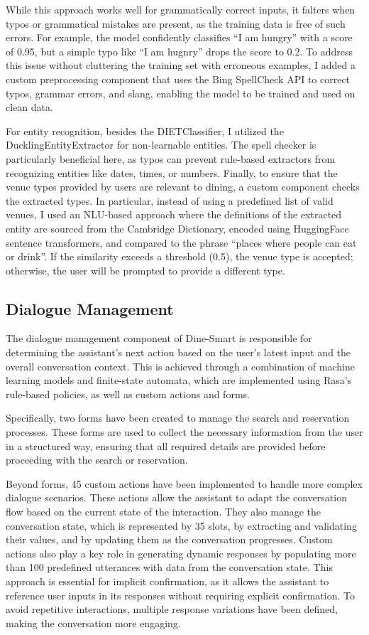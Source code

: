 \documentclass[twocolumn]{article}
\begin{document}
While this approach works well for grammatically correct inputs, it falters when typos or grammatical mistakes are present, as the training data is free of such errors. For example, the model confidently classifies ``I am hungry'' with a score of 0.95, but a simple typo like ``I am hugnry'' drops the score to 0.2. To address this issue without cluttering the training set with erroneous examples, I added a custom preprocessing component that uses the Bing SpellCheck API to correct typos, grammar errors, and slang, enabling the model to be trained and used on clean data.

For entity recognition, besides the DIETClassifier, I utilized the DucklingEntityExtractor for non-learnable entities. The spell checker is particularly beneficial here, as typos can prevent rule-based extractors from recognizing entities like dates, times, or numbers. Finally, to ensure that the venue types provided by users are relevant to dining, a custom component checks the extracted types. In particular, instead of using a predefined list of valid venues, I used an NLU-based approach where the definitions of the extracted entity are sourced from the Cambridge Dictionary, encoded using HuggingFace sentence transformers, and compared to the phrase ``places where people can eat or drink''. If the similarity exceeds a threshold (0.5), the venue type is accepted; otherwise, the user will be prompted to provide a different type.

\subsection{Dialogue Management}

The dialogue management component of Dine-Smart is responsible for determining the assistant's next action based on the user's latest input and the overall conversation context. This is achieved through a combination of machine learning models and finite-state automata, which are implemented using Rasa's rule-based policies, as well as custom actions and forms.

Specifically, two forms have been created to manage the search and reservation processes. These forms are used to collect the necessary information from the user in a structured way, ensuring that all required details are provided before proceeding with the search or reservation.

Beyond forms, 45 custom actions have been implemented to handle more complex dialogue scenarios. These actions allow the assistant to adapt the conversation flow based on the current state of the interaction. They also manage the conversation state, which is represented by 35 slots, by extracting and validating their values, and by updating them as the conversation progresses. Custom actions also play a key role in generating dynamic responses by populating more than 100 predefined utterances with data from the conversation state. This approach is essential for implicit confirmation, as it allows the assistant to reference user inputs in its responses without requiring explicit confirmation. To avoid repetitive interactions, multiple response variations have been defined, making the conversation more engaging.
\end{document}
